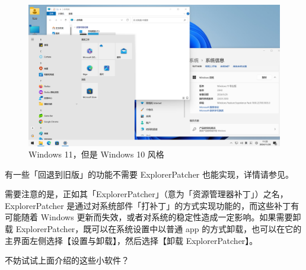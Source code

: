 \begin{figure}[htb!]
  \centering
  \includegraphics[width=.8\textwidth]{assets/software/EP_cosplay.png}
  \caption{Windows 11，但是 Windows 10 风格}
  \label{fig:EP_cosplay}
\end{figure}

\begin{note}
  有一些「回退到旧版」的功能不需要 ExplorerPatcher 也能实现，详情请参见。
\end{note}

需要注意的是，正如其「ExplorerPatcher」（意为「资源管理器补丁」）之名，ExplorerPatcher 是通过对系统部件「打补丁」的方式实现功能的，而这些补丁有可能随着 Windows 更新而失效，或者对系统的稳定性造成一定影响。如果需要卸载 ExplorerPatcher，既可以在系统设置中以普通 app 的方式卸载，也可以在它的主界面左侧选择【设置与卸载】，然后选择【卸载 ExplorerPatcher】。

\practice

不妨试试上面介绍的这些小软件？